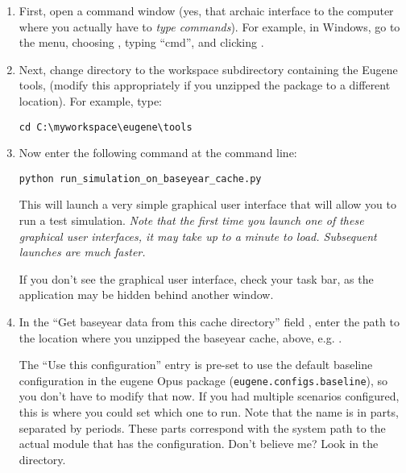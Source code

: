 \documentclass{howto}
\begin{document}
\begin{enumerate}

\item First, open a command window (yes, that archaic interface to the
computer where you actually have to \emph{type commands}). For
example, in Windows, go to the  menu, choosing
, typing ``cmd'', and clicking .

\item Next, change directory to the workspace subdirectory containing
the Eugene tools, 
(modify this appropriately if you unzipped the package to a different location).
For example, type:

\begin{verbatim}
cd C:\myworkspace\eugene\tools
\end{verbatim}

\item Now enter the following command at the command line:

\begin{verbatim}
python run_simulation_on_baseyear_cache.py
\end{verbatim}

This will launch a very simple graphical user interface that will allow you to
run a test simulation.  \emph{Note that the first time you launch one of these
graphical user interfaces, it may take up to a minute to load.  Subsequent
launches are much faster.}

If you don't see the graphical user interface, check your task bar, as the
application may be hidden behind another window.

\item In the ``Get baseyear data from this cache directory'' field , enter the
path to the location where you unzipped the
baseyear cache, above, e.g. 
.

The ``Use this configuration'' entry is pre-set to use the
default baseline configuration in the eugene Opus package
(\verb|eugene.configs.baseline|), so you don't have to modify that
now.  If you had multiple scenarios configured, this is where you
could set which one to run.  Note that the name is in parts,
separated by periods.  These parts correspond with the system path
to the actual module that has the configuration.  Don't believe me?
Look in the  directory.


\end{enumerate}
\end{document}
